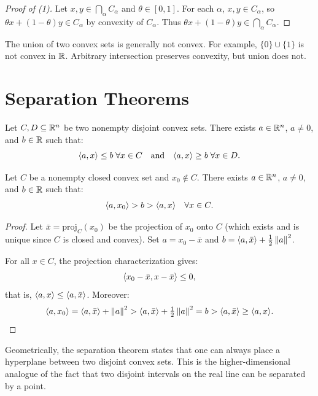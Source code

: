 \begin{proof}[Proof of (1)]
Let $x, y \in \bigcap_\alpha C_\alpha$ and $\theta \in [0,1]$. For each $\alpha$,
$x, y \in C_\alpha$, so $\theta x + (1-\theta)y \in C_\alpha$ by convexity of
$C_\alpha$. Thus $\theta x + (1-\theta)y \in \bigcap_\alpha C_\alpha$.
\end{proof}

\begin{remark}
The union of two convex sets is generally not convex. For example, $\{0\} \cup \{1\}$
is not convex in $\mathbb{R}$. Arbitrary intersection preserves convexity, but union does not.
\end{remark}

\section{Separation Theorems}

\begin{theorem}
\label{thm:separation}
Let $C, D \subseteq \mathbb{R}^n$ be two nonempty disjoint convex sets. There exists
$a \in \mathbb{R}^n$, $a \neq 0$, and $b \in \mathbb{R}$ such that:
\[
    \langle a, x \rangle \leq b \; \forall x \in C
    \quad \text{and} \quad
    \langle a, x \rangle \geq b \; \forall x \in D.
\]
\end{theorem}

\begin{theorem}
\label{thm:strict_separation}
Let $C$ be a nonempty closed convex set and $x_0 \notin C$. There exists
$a \in \mathbb{R}^n$, $a \neq 0$, and $b \in \mathbb{R}$ such that:
\[
    \langle a, x_0 \rangle > b > \langle a, x \rangle \quad \forall x \in C.
\]
\end{theorem}

\begin{proof}
Let $\bar{x} = \mathrm{proj}_C(x_0)$ be the projection of $x_0$ onto $C$ (which
exists and is unique since $C$ is closed and convex). Set $a = x_0 - \bar{x}$ and
$b = \langle a, \bar{x} \rangle + \frac{1}{2}\left\| a \right\|^2$.

For all $x \in C$, the projection characterization gives:
\[
    \langle x_0 - \bar{x}, x - \bar{x} \rangle \leq 0,
\]
that is, $\langle a, x \rangle \leq \langle a, \bar{x} \rangle$. Moreover:
\[
    \langle a, x_0 \rangle = \langle a, \bar{x} \rangle + \left\| a \right\|^2 > \langle a, \bar{x} \rangle + \tfrac{1}{2}\left\| a \right\|^2 = b > \langle a, \bar{x} \rangle \geq \langle a, x \rangle.
\]
\end{proof}

\begin{intuition}
Geometrically, the separation theorem states that one can always place a hyperplane
between two disjoint convex sets. This is the higher-dimensional analogue of the fact
that two disjoint intervals on the real line can be separated by a point.
\end{intuition}

